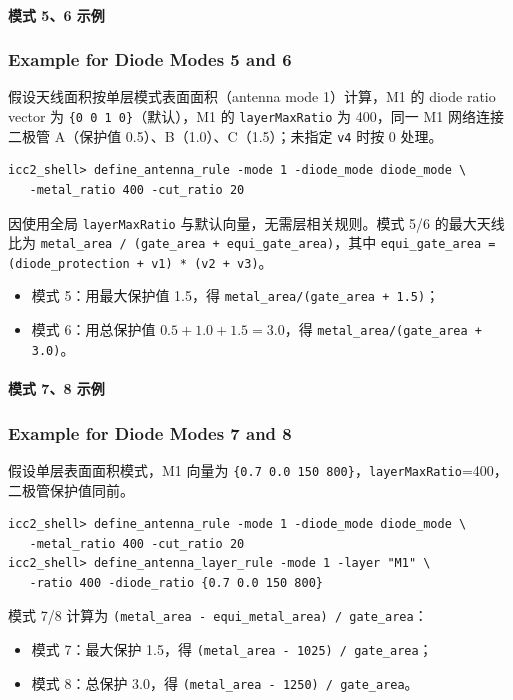
\paragraph{模式 5、6 示例}
\subsubsection*{Example for Diode Modes 5 and 6}

假设天线面积按单层模式表面面积（antenna mode 1）计算，M1 的 diode ratio vector 为 \texttt{\{0 0 1 0\}}（默认），M1 的 \texttt{layerMaxRatio} 为 400，同一 M1 网络连接二极管 A（保护值 0.5）、B（1.0）、C（1.5）；未指定 \texttt{v4} 时按 0 处理。

\begin{lstlisting}
icc2_shell> define_antenna_rule -mode 1 -diode_mode diode_mode \
   -metal_ratio 400 -cut_ratio 20
\end{lstlisting}

因使用全局 \texttt{layerMaxRatio} 与默认向量，无需层相关规则。模式 5/6 的最大天线比为
\texttt{metal\_area / (gate\_area + equi\_gate\_area)}，其中
\texttt{equi\_gate\_area = (diode\_protection + v1) * (v2 + v3)}。
\begin{itemize}
  \item 模式 5：用最大保护值 1.5，得 \texttt{metal\_area/(gate\_area + 1.5)}；
  \item 模式 6：用总保护值 \(0.5+1.0+1.5=3.0\)，得 \texttt{metal\_area/(gate\_area + 3.0)}。
\end{itemize}

\paragraph{模式 7、8 示例}
\subsubsection*{Example for Diode Modes 7 and 8}

假设单层表面面积模式，M1 向量为 \texttt{\{0.7 0.0 150 800\}}，\texttt{layerMaxRatio}=400，二极管保护值同前。

\begin{lstlisting}
icc2_shell> define_antenna_rule -mode 1 -diode_mode diode_mode \
   -metal_ratio 400 -cut_ratio 20
icc2_shell> define_antenna_layer_rule -mode 1 -layer "M1" \
   -ratio 400 -diode_ratio {0.7 0.0 150 800}
\end{lstlisting}

模式 7/8 计算为 \texttt{(metal\_area - equi\_metal\_area) / gate\_area}：
\begin{itemize}
  \item 模式 7：最大保护 1.5，得 \texttt{(metal\_area - 1025) / gate\_area}；
  \item 模式 8：总保护 3.0，得 \texttt{(metal\_area - 1250) / gate\_area}。
\end{itemize}

